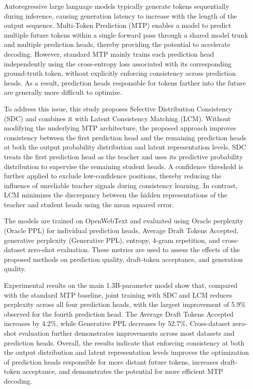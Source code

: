 
\begin{enAbstract}

    Autoregressive large language models typically generate tokens sequentially during inference, causing generation latency to increase with the length of the output sequence. Multi-Token Prediction (MTP) enables a model to predict multiple future tokens within a single forward pass through a shared model trunk and multiple prediction heads, thereby providing the potential to accelerate decoding. However, standard MTP mainly trains each prediction head independently using the cross-entropy loss associated with its corresponding ground-truth token, without explicitly enforcing consistency across prediction heads. As a result, prediction heads responsible for tokens farther into the future are generally more difficult to optimize.

    To address this issue, this study proposes Selective Distribution Consistency (SDC) and combines it with Latent Consistency Matching (LCM). Without modifying the underlying MTP architecture, the proposed approach improves consistency between the first prediction head and the remaining prediction heads at both the output probability distribution and latent representation levels. SDC treats the first prediction head as the teacher and uses its predictive probability distribution to supervise the remaining student heads. A confidence threshold is further applied to exclude low-confidence positions, thereby reducing the influence of unreliable teacher signals during consistency learning. In contrast, LCM minimizes the discrepancy between the hidden representations of the teacher and student heads using the mean squared error.

    The models are trained on OpenWebText and evaluated using Oracle perplexity (Oracle PPL) for individual prediction heads, Average Draft Tokens Accepted, generative perplexity (Generative PPL), entropy, 4-gram repetition, and cross-dataset zero-shot evaluation. These metrics are used to assess the effects of the proposed methods on prediction quality, draft-token acceptance, and generation quality.

    Experimental results on the main 1.3B-parameter model show that, compared with the standard MTP baseline, joint training with SDC and LCM reduces perplexity across all four prediction heads, with the largest improvement of 5.9\% observed for the fourth prediction head. The Average Draft Tokens Accepted increases by 4.2\%, while Generative PPL decreases by 52.7\%. Cross-dataset zero-shot evaluation further demonstrates improvements across most datasets and prediction heads. Overall, the results indicate that enforcing consistency at both the output distribution and latent representation levels improves the optimization of prediction heads responsible for more distant future tokens, increases draft-token acceptance, and demonstrates the potential for more efficient MTP decoding.

    \enAbsKeywords
\end{enAbstract}
